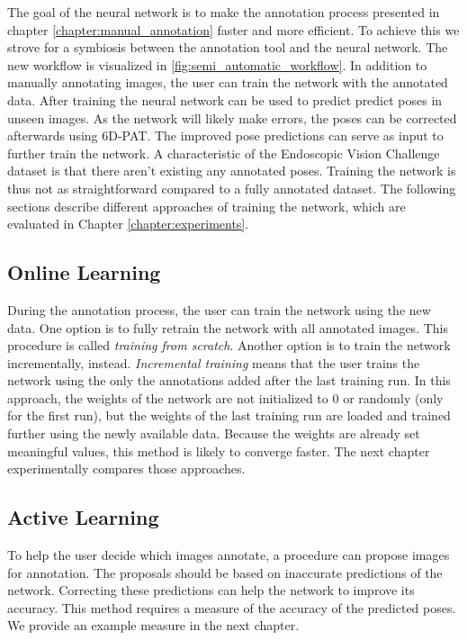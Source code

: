 The goal of the neural network is to make the annotation process presented in chapter \ref{chapter:manual_annotation} faster and more efficient. To achieve this we strove for a symbiosis between the annotation tool and the neural network. The new workflow is visualized in \fig \ref{fig:semi_automatic_workflow}. In addition to manually annotating images, the user can train the network with the annotated data. After training the neural network can be used to predict predict poses in unseen images. As the network will likely make errors, the poses can be corrected afterwards using 6D-PAT. The improved pose predictions can serve as input to further train the network. A characteristic of the Endoscopic Vision Challenge dataset is that there aren't existing any annotated poses. Training the network is thus not as straightforward compared to a fully annotated dataset. The following sections describe different approaches of training the network, which are evaluated in Chapter \ref{chapter:experiments}.

\subsection{Online Learning}

During the annotation process, the user can train the network using the new data. One option is to fully retrain the network with all  annotated images. This procedure is called \textit{training from scratch}. Another option is to train the network incrementally, instead. \textit{Incremental training} means that the user trains the network using the only the annotations added after the last training run. In this approach, the weights of the network are not initialized to 0 or randomly (only for the first run), but the weights of the last training run are loaded and trained further using the newly available data. Because the weights are already set meaningful values, this method is likely to converge faster. The next chapter experimentally compares those approaches.

\subsection{Active Learning}

To help the user decide which images annotate, a procedure can propose images for annotation. The proposals should be based on inaccurate predictions of the network. Correcting these predictions can help the network to improve its accuracy. This method requires a measure of the accuracy of the predicted poses. We provide an example measure in the next chapter.

